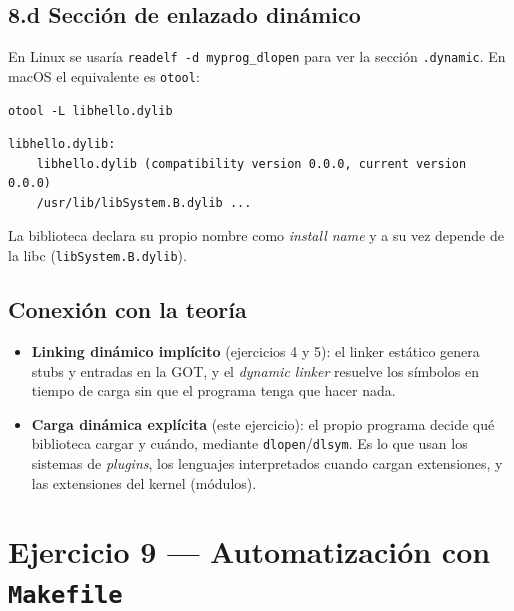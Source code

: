 \documentclass[11pt,a4paper]{article}
\begin{document}
\subsection*{8.d Sección de enlazado dinámico}

En Linux se usaría \texttt{readelf -d myprog\_dlopen} para ver la
sección \texttt{.dynamic}. En macOS el equivalente es \texttt{otool}:

\begin{lstlisting}
otool -L libhello.dylib
\end{lstlisting}

\begin{lstlisting}[style=outstyle]
libhello.dylib:
    libhello.dylib (compatibility version 0.0.0, current version 0.0.0)
    /usr/lib/libSystem.B.dylib ...
\end{lstlisting}

La biblioteca declara su propio nombre como \emph{install name} y a
su vez depende de la libc (\texttt{libSystem.B.dylib}).

\subsection*{Conexión con la teoría}

\begin{idea}
\begin{itemize}[leftmargin=*, itemsep=0pt]
    \item \textbf{Linking dinámico implícito} (ejercicios 4 y 5): el
        linker estático genera stubs y entradas en la GOT, y el
        \emph{dynamic linker} resuelve los símbolos en tiempo de
        carga sin que el programa tenga que hacer nada.
    \item \textbf{Carga dinámica explícita} (este ejercicio): el
        propio programa decide qué biblioteca cargar y cuándo,
        mediante \texttt{dlopen}/\texttt{dlsym}. Es lo que usan los
        sistemas de \emph{plugins}, los lenguajes interpretados
        cuando cargan extensiones, y las extensiones del kernel
        (módulos).
\end{itemize}
\end{idea}

\section{Ejercicio 9 --- Automatización con \texttt{Makefile}}
\end{document}
